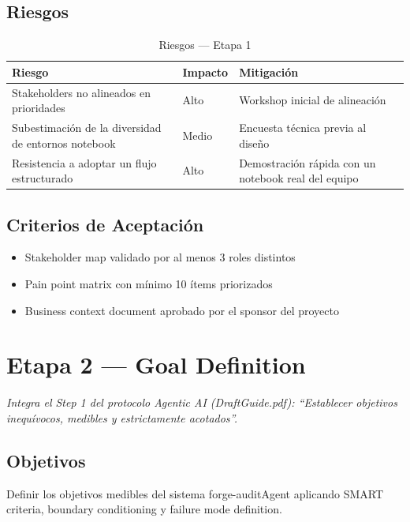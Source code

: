 \documentclass[12pt,a4paper]{article}
\begin{document}
\subsection*{Riesgos}
\begin{table}[h]
\centering
\begin{tabular}{p{} p{} p{}}
\toprule
\textbf{Riesgo} & \textbf{Impacto} & \textbf{Mitigación} \\
\midrule
Stakeholders no alineados en prioridades                     & Alto  & Workshop inicial de alineación \\
Subestimación de la diversidad de entornos notebook           & Medio & Encuesta técnica previa al diseño \\
Resistencia a adoptar un flujo estructurado                   & Alto  & Demostración rápida con un notebook real del equipo \\
\bottomrule
\end{tabular}
\caption{Riesgos --- Etapa 1}
\end{table}

\subsection*{Criterios de Aceptación}
\begin{itemize}
  \item[{${[\;]}$}] Stakeholder map validado por al menos 3 roles distintos
  \item[{${[\;]}$}] Pain point matrix con mínimo 10 ítems priorizados
  \item[{${[\;]}$}] Business context document aprobado por el sponsor del proyecto
\end{itemize}

\section{Etapa 2 --- Goal Definition}

\emph{Integra el Step 1 del protocolo Agentic AI (DraftGuide.pdf): ``Establecer objetivos inequívocos, medibles y estrictamente acotados''.}

\subsection*{Objetivos}
Definir los objetivos medibles del sistema forge-auditAgent aplicando SMART criteria, boundary conditioning y failure mode definition.
\end{document}
